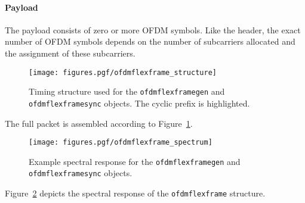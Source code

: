 \paragraph{Payload}
    The payload consists of zero or more OFDM symbols. Like the header,
    the exact number of OFDM symbols depends on the number of
    subcarriers allocated and the assignment of these subcarriers.

% 
%
\begin{figure}
\centering
  \texttt{[image: figures.pgf/ofdmflexframe\_structure]}
\caption{
    Timing structure used for the {\tt ofdmflexframegen} and
    {\tt ofdmflexframesync} objects.
    The cyclic prefix is highlighted.}
\label{fig:module:framing:ofdmflexframe_structure}
\end{figure}
%
The full packet is assembled according to
Figure~\ref{fig:module:framing:ofdmflexframe_structure}.
% 
%
\begin{figure}
\centering
  \texttt{[image: figures.pgf/ofdmflexframe\_spectrum]}
\caption{
    Example spectral response for the
    {\tt ofdmflexframegen} and
    {\tt ofdmflexframesync} objects.}
\label{fig:module:framing:ofdmflexframe_spectrum}
\end{figure}
%
Figure~\ref{fig:module:framing:ofdmflexframe_spectrum} depicts the
spectral response of the {\tt ofdmflexframe} structure.

